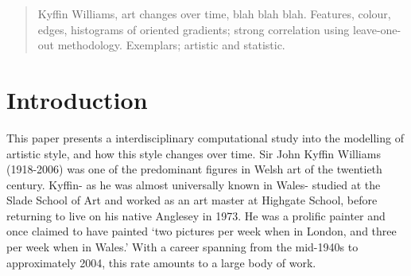 \documentclass[conference,a4paper]{IEEEtran}
\begin{document}




\maketitle


\begin{abstract}
Kyffin Williams, art changes over time, blah blah blah. Features, colour, edges, histograms of oriented gradients; strong correlation using leave-one-out methodology.
Exemplars; artistic and statistic. 
\end{abstract}





%
\IEEEpeerreviewmaketitle



\section{Introduction}

This paper presents a interdisciplinary computational study into the modelling of artistic style, 
and how this style changes over time.  Sir John Kyffin Williams (1918-2006) was one of the 
predominant figures in Welsh art of the twentieth century.  Kyffin- as he was almost universally 
known in Wales- studied at the Slade School of Art and worked as an art master at Highgate School,
before returning to live on his native Anglesey in 1973.  He was a prolific painter and once 
claimed to have painted `two pictures per week when in London, and three per week when in 
Wales.'\cite[p.209]{Williams1993Across} With a career spanning from the mid-1940s to approximately 2004, 
this rate amounts to a large body of work.
\end{document}

